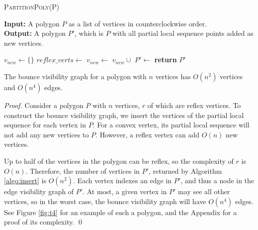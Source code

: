 \documentclass[]{styles/svproc}  %
\begin{document}
\begin{algorithm}
\caption{\textsc{PartitionPoly}(P)}
\label{algo:insert}
\hspace*{\algorithmicindent} \textbf{Input:} A polygon $P$ as a list of
vertices in counterclockwise order.\\
\hspace*{\algorithmicindent} \textbf{Output:} A polygon $P'$, which is $P$ with
all partial local sequence points added as new vertices.
\begin{algorithmic}[1]
\State $v_{new} \gets \{\}$
\State $reflex\_verts \gets$ 
        \State $v_{new} \gets$ $v_{new} \cup$ 
    \EndFor
\EndFor
\State $P' \gets$ 
\State \textbf{return} $P'$
\end{algorithmic}
\end{algorithm}

\begin{proposition} The bounce visibility graph for a polygon with $n$ vertices has 
$O(n^2)$ vertices and $O(n^4)$ edges.
\end{proposition}

\begin{proof}

Consider a polygon $P$ with $n$ vertices, $r$ of which are reflex vertices. To
construct the bounce visibility graph, we insert the vertices of the partial
local sequence for each vertex in $P$. For a convex vertex, its partial local sequence 
will not add any new vertices to $P$. However, a reflex vertex can add $O(n)$ new vertices. 

Up to half of the vertices in the polygon can be reflex, so the complexity of
$r$ is $O(n)$. Therefore, the number of vertices in $P'$, returned by Algorithm
\ref{algo:insert} is $O(n^2)$. Each vertex indexes an edge in $P'$, and
thus a node in the edge visibility graph of $P'$. At most, a given vertex in $P'$ may see all other vertices, so in the worst
case, the bounce visibility graph will have $O(n^4)$ edges. See Figure
\ref{fig:t4} for an example of such a polygon, and the Appendix for a proof of
its complexity.
\qed

\end{proof}



%
%
\end{document}
